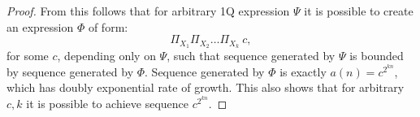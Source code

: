 \documentclass[12pt]{article}
\newcommand{\filip}[1]{\todo[color=green!10]{{\bf Filip:} #1}}
\theoremstyle{definition}
\begin{document}
\begin{proof}
    From this follows that for arbitrary 1Q expression $\varPsi$ it is possible to create an expression $\varPhi$ of form:
    $$\Pi_{X_1}\Pi_{X_2}\ldots \Pi_{X_k} \ c,$$
    for some $c$, depending only on $\varPsi$, such that sequence generated by $\varPsi$ is bounded by sequence generated by $\varPhi$. Sequence generated by $\varPhi$ is exactly $a(n) = c^{2^{kn}}$, which has doubly exponential rate of growth. This also shows that for arbitrary $c, k$ it is possible to achieve sequence $c^{2^{kn}}$.







    






\end{proof}
\end{document}
